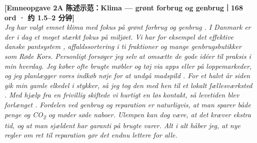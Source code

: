 \begin{transbox}
\small
\textbf{\color{NCDNavy}[Emneopgave 2A 陈述示范：Klima --- grønt forbrug og genbrug｜168 ord · 约 1.5--2 分钟]}\\
\textit{Jeg har valgt emnet klima med fokus på grønt forbrug  og genbrug . I Danmark er der i dag et meget stærkt fokus på miljøet. Vi har for eksempel det effektive danske pantsystem , affaldssortering i ti fraktioner og mange genbrugsbutikker som Røde Kors. Personligt forsøger jeg selv at omsætte de gode idéer til praksis i min hverdag. Jeg køber ofte brugte møbler og tøj via apps eller på loppemarkeder, og jeg planlægger vores indkøb nøje for at undgå madspild . For et halvt år siden gik min gamle elkedel i stykker, så jeg tog den med hen til et lokalt fællesværksted . Med hjælp fra en frivillig skiftede vi hurtigt en løs kontakt, så levetiden blev forlænget . Fordelen ved genbrug og reparation er naturligvis, at man sparer både penge og CO\textsubscript{2} og møder søde naboer. Ulempen kan dog være, at det kræver ekstra tid, og at man sjældent har garanti på brugte varer. Alt i alt håber jeg, at nye regler om ret til reparation gør det endnu lettere for alle.}
\end{transbox}

